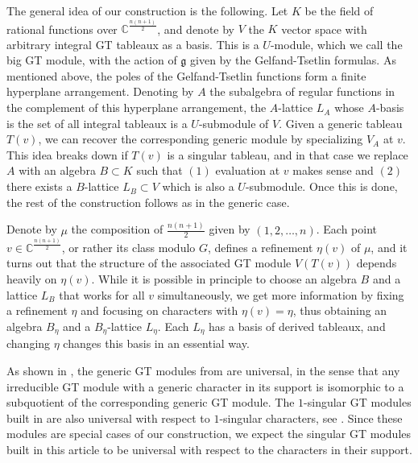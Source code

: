 \documentclass[11pt,fleqn]{article}
\newcommand\CC{\mathbb C}
\newcommand\g{\mathfrak g}
\newcommand\bigmodule{big GT module}
\begin{document}
The general idea of our construction is the following. Let $K$ be the field of 
rational functions over $\CC^{\frac{n(n+1)}{2}}$, and denote by $V$ the $K$ 
vector space with arbitrary integral GT tableaux as a basis. This is a 
$U$-module, which we call the \bigmodule, with the action of $\g$ given by the 
Gelfand-Tsetlin formulas. As mentioned above, the poles of the Gelfand-Tsetlin 
functions form a finite hyperplane arrangement. Denoting by $A$ the subalgebra 
of regular functions in the complement of this hyperplane arrangement, the 
$A$-lattice $L_A$ whose $A$-basis is the set of all integral tableaux is a 
$U$-submodule of $V$. Given a generic tableau $T(v)$, we can recover the 
corresponding generic module by specializing $V_A$ at $v$. This idea breaks 
down if $T(v)$ is a singular tableau, and in that case we replace $A$ with an 
algebra $B \subset K$ such that $(1)$ evaluation at $v$ makes sense and $(2)$ 
there exists a $B$-lattice $L_B \subset V$ which is also a $U$-submodule. Once 
this is done, the rest of the construction follows as in the generic case.

Denote by $\mu$ the composition of $\frac{n(n+1)}{2}$ given by 
$(1,2,\ldots, n)$. Each point $v \in \CC^{\frac{n(n+1)}{2}}$, or rather its 
class modulo $G$, defines a refinement $\eta(v)$ of $\mu$, and it turns out 
that the structure of the associated GT module $V(T(v))$ depends heavily on 
$\eta(v)$. While it is possible in principle to choose an algebra $B$ and a 
lattice $L_B$ that works for all $v$ simultaneously, we get more information 
by fixing a refinement $\eta$ and focusing on characters with $\eta(v) = 
\eta$, thus obtaining an algebra $B_\eta$ and a $B_\eta$-lattice $L_\eta$. 
Each $L_\eta$ has a basis of derived tableaux, and changing $\eta$ changes 
this basis in an essential way.

As shown in \cite{FGR-generic-irreducible}, the generic GT modules from 
\cite{DFO-GT-modules} are universal, in the sense that any irreducible GT 
module with a generic character in its support is isomorphic to a subquotient
of the corresponding generic GT module. The $1$-singular GT modules built in 
\cite{FGR-1-singular} are also universal with respect to $1$-singular 
characters, see \cite{FGR-drinfeld}. Since these modules are special cases of
our construction, we expect the singular GT modules built in this article to
be universal with respect to the characters in their support.
\end{document}
